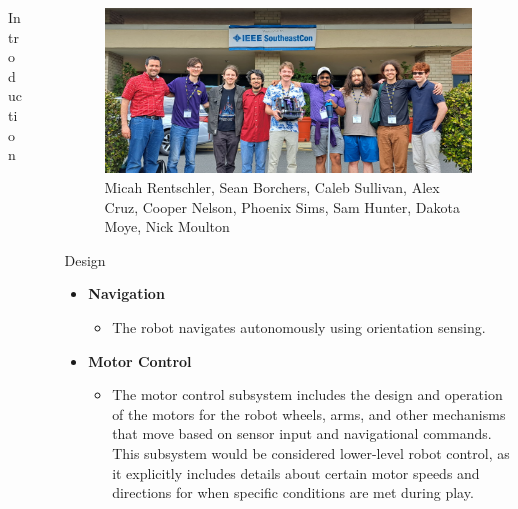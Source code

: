 \documentclass[final]{beamer}
\newlength{\sepwidth}
\newlength{\colwidth}
\newcommand{\separatorcolumn}{\begin{column}{\sepwidth}\end{column}}
\begin{document}
\begin{frame}[t]
\begin{columns}[t]
\begin{column}{\colwidth}
\begin{block}{Introduction}
  \end{block}




    

\end{column}

\separatorcolumn

\begin{column}{\colwidth}

    \begin{figure}
      \centering
      \includegraphics[width=30.0cm]{Team Picture SECON 2025.jpg}
      \caption{Micah Rentschler, Sean Borchers, Caleb Sullivan, Alex Cruz, Cooper Nelson, Phoenix Sims, Sam Hunter, Dakota Moye, Nick Moulton}
    \end{figure}

    \begin{block}{Design}
    \begin{itemize}
    
      \item \textbf{Navigation}
        \begin{itemize}
          \item The robot navigates autonomously using orientation sensing.
        \end{itemize}
        
      \item \textbf{Motor Control}
        \begin{itemize}
          \item The motor control subsystem includes the design and operation of the motors for the robot wheels, arms, and other mechanisms that move based on sensor input and navigational commands. This subsystem would be considered lower-level robot control, as it explicitly includes details about certain motor speeds and directions for when specific conditions are met during play.
        \end{itemize}
      

\end{itemize}
\end{block}
\end{column}
\end{columns}
\end{frame}
\end{document}
